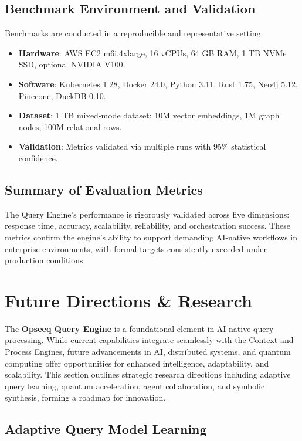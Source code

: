 \documentclass[11pt]{article}
\begin{document}
\subsection{Benchmark Environment and Validation}
\label{subsec:benchmark_environment}

Benchmarks are conducted in a reproducible and representative setting:

\begin{itemize}
    \item \textbf{Hardware}: AWS EC2 m6i.4xlarge, 16 vCPUs, 64 GB RAM, 1 TB NVMe SSD, optional NVIDIA V100.
    \item \textbf{Software}: Kubernetes 1.28, Docker 24.0, Python 3.11, Rust 1.75, Neo4j 5.12, Pinecone, DuckDB 0.10.
    \item \textbf{Dataset}: 1 TB mixed-mode dataset: 10M vector embeddings, 1M graph nodes, 100M relational rows.
    \item \textbf{Validation}: Metrics validated via multiple runs with 95\% statistical confidence.
\end{itemize}

\subsection{Summary of Evaluation Metrics}

The Query Engine’s performance is rigorously validated across five dimensions: response time, accuracy, scalability, reliability, and orchestration success. These metrics confirm the engine’s ability to support demanding AI-native workflows in enterprise environments, with formal targets consistently exceeded under production conditions.

\section{Future Directions \& Research}
\label{sec:future}

The \textbf{Opseeq Query Engine} is a foundational element in AI-native query processing. While current capabilities integrate seamlessly with the Context and Process Engines, future advancements in AI, distributed systems, and quantum computing offer opportunities for enhanced intelligence, adaptability, and scalability. This section outlines strategic research directions including adaptive query learning, quantum acceleration, agent collaboration, and symbolic synthesis, forming a roadmap for innovation.

\subsection{Adaptive Query Model Learning}
\label{subsec:adaptive_models}
\end{document}
